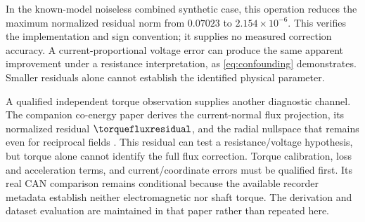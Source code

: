In the known-model noiseless combined synthetic case, this operation reduces
the maximum normalized residual norm from $0.07023$ to
$2.154\times10^{-6}$. This verifies the implementation and sign convention;
it supplies no measured correction accuracy. A current-proportional voltage
error can produce the same apparent improvement under a resistance
interpretation, as \cref{eq:confounding} demonstrates. Smaller residuals alone
cannot establish the identified physical parameter.

A qualified independent torque observation supplies another diagnostic
channel. The companion co-energy paper derives the current-normal flux
projection, its normalized residual $\torquefluxresidual$, and the
radial nullspace that remains even for reciprocal fields
\cite{companion-coenergy}. This residual can test a resistance/voltage
hypothesis, but torque alone cannot identify the full flux correction.
Torque calibration, loss and acceleration terms, and current/coordinate
errors must be qualified first. Its real CAN comparison remains conditional
because the available recorder metadata establish neither electromagnetic
nor shaft torque. The derivation and dataset evaluation are maintained
in that paper rather than repeated here.
